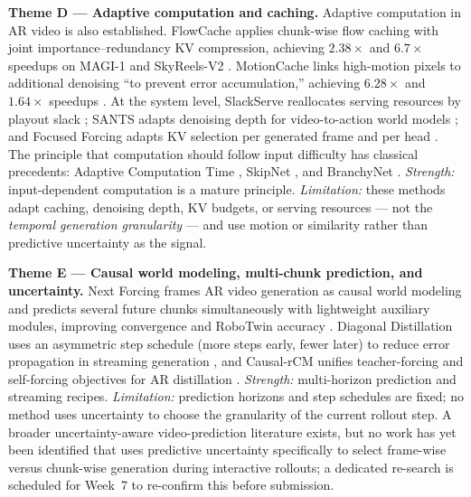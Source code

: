 \documentclass[11pt,a4paper]{article}
\begin{document}
\textbf{Theme D --- Adaptive computation and caching.}
Adaptive computation in AR video is also established. FlowCache applies chunk-wise flow caching with joint importance--redundancy KV compression, achieving $2.38\times$ and $6.7\times$ speedups on MAGI-1 and SkyReels-V2 \parencite{maFlowCachingAutoregressive2026}. MotionCache links high-motion pixels to additional denoising ``to prevent error accumulation,'' achieving $6.28\times$ and $1.64\times$ speedups \parencite{xuMotionAwareCachingEfficient2026}. At the system level, SlackServe reallocates serving resources by playout slack \parencite{xiaAdaptiveResourceManagement2026}; SANTS adapts denoising depth for video-to-action world models \parencite{sunSANTSStateAdaptiveScheduler2026}; and Focused Forcing adapts KV selection per generated frame and per head \parencite{caiFocusedForcingContentAware2026}. The principle that computation should follow input difficulty has classical precedents: Adaptive Computation Time \parencite{gravesAdaptiveComputationTime2017}, SkipNet \parencite{wangSkipNetLearningDynamic2018}, and BranchyNet \parencite{teerapittayanonBranchyNetFastInference2017}. \emph{Strength:} input-dependent computation is a mature principle. \emph{Limitation:} these methods adapt caching, denoising depth, KV budgets, or serving resources --- not the \emph{temporal generation granularity} --- and use motion or similarity rather than predictive uncertainty as the signal.

\textbf{Theme E --- Causal world modeling, multi-chunk prediction, and uncertainty.}
Next Forcing frames AR video generation as causal world modeling and predicts several future chunks simultaneously with lightweight auxiliary modules, improving convergence and RoboTwin accuracy \parencite{xuNextForcingCausal2026}. Diagonal Distillation uses an asymmetric step schedule (more steps early, fewer later) to reduce error propagation in streaming generation \parencite{liuStreamingAutoregressiveVideo2026}, and Causal-rCM unifies teacher-forcing and self-forcing objectives for AR distillation \parencite{zhengCausalrCMUnifiedTeacherForcing2026}. \emph{Strength:} multi-horizon prediction and streaming recipes. \emph{Limitation:} prediction horizons and step schedules are fixed; no method uses uncertainty to choose the granularity of the current rollout step. A broader uncertainty-aware video-prediction literature exists, but no work has yet been identified that uses predictive uncertainty specifically to select frame-wise versus chunk-wise generation during interactive rollouts; a dedicated re-search is scheduled for Week~7 to re-confirm this before submission.
\end{document}
